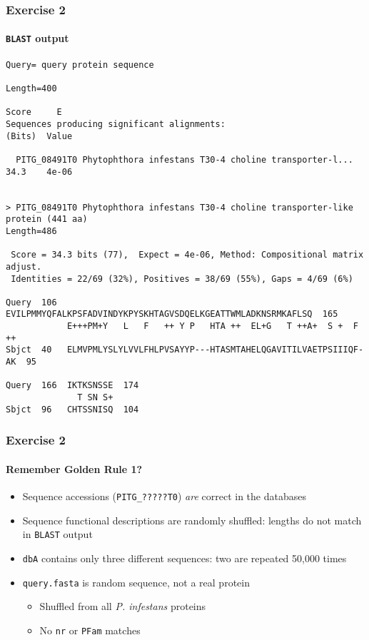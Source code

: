 \begin{frame}[fragile]
  \frametitle{Exercise 2}
  \framesubtitle{\texttt{BLAST} output}
  \begin{tiny}
  \begin{verbatim}
Query= query protein sequence

Length=400
                                                                      Score     E
Sequences producing significant alignments:                          (Bits)  Value

  PITG_08491T0 Phytophthora infestans T30-4 choline transporter-l...  34.3    4e-06


> PITG_08491T0 Phytophthora infestans T30-4 choline transporter-like 
protein (441 aa)
Length=486

 Score = 34.3 bits (77),  Expect = 4e-06, Method: Compositional matrix adjust.
 Identities = 22/69 (32%), Positives = 38/69 (55%), Gaps = 4/69 (6%)

Query  106  EVILPMMYQFALKPSFADVINDYKPYSKHTAGVSDQELKGEATTWMLADKNSRMKAFLSQ  165
            E+++PM+Y   L   F   ++ Y P   HTA ++  EL+G   T ++A+  S +  F ++
Sbjct  40   ELMVPMLYSLYLVVLFHLPVSAYYP---HTASMTAHELQGAVITILVAETPSIIIQF-AK  95

Query  166  IKTKSNSSE  174
              T SN S+
Sbjct  96   CHTSSNISQ  104
  \end{verbatim}   
  \end{tiny} 
\end{frame}

\begin{frame}
  \frametitle{Exercise 2}
  \framesubtitle{Remember Golden Rule 1?}    
  \begin{itemize}
    \item<1-> Sequence accessions (\texttt{PITG\_?????T0}) \emph{are} correct in the databases
    \item<2-> Sequence functional descriptions are randomly shuffled: lengths do not match in \texttt{BLAST} output
    \item<3-> \texttt{dbA} contains only three different sequences: two are repeated 50,000 times
    \item<4-> \texttt{query.fasta} is random sequence, not a real protein
    \begin{itemize}
      \item<4-> Shuffled from all \textit{P. infestans} proteins
      \item<4-> No \texttt{nr} or \texttt{PFam} matches        
    \end{itemize}
  \end{itemize}
\end{frame}
